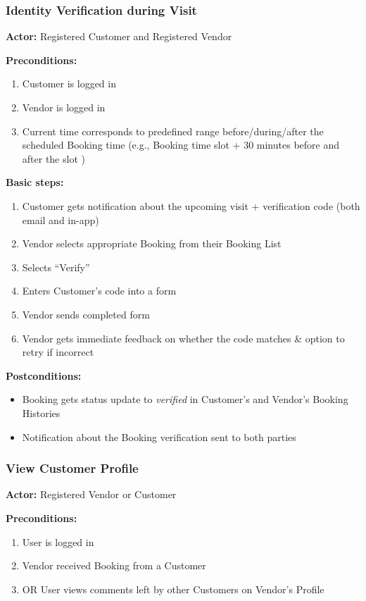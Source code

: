 \documentclass[11pt,a4paper]{article}
\begin{document}
\subsubsection{Identity Verification during Visit}

\textbf{Actor:} Registered Customer and Registered Vendor

\noindent \textbf{Preconditions:}
\begin{enumerate}
  \item Customer is logged in
  \item Vendor is logged in
  \item Current time corresponds to predefined range before/during/after the scheduled Booking time (e.g., Booking time slot + 30 minutes before and after the slot )
\end{enumerate}

\noindent \textbf{Basic steps:}
\begin{enumerate}
  \item Customer gets notification about the upcoming visit + verification code (both email and in-app)
  \item Vendor selects appropriate Booking from their Booking List
  \item Selects ``Verify''
  \item Enters Customer's code into a form
  \item Vendor sends completed form
  \item Vendor gets immediate feedback on whether the code matches \& option to retry if incorrect
\end{enumerate}

\noindent \textbf{Postconditions:}
\begin{itemize}
  \item Booking gets status update to \textit{verified} in Customer's and Vendor's Booking Histories
  \item Notification about the Booking verification sent to both parties
\end{itemize}

\subsubsection{View Customer Profile}

\textbf{Actor:} Registered Vendor or Customer

\noindent \textbf{Preconditions:}
\begin{enumerate}
  \item User is logged in
  \item Vendor received Booking from a Customer
  \item OR User views comments left by other Customers on Vendor's Profile
\end{enumerate}
\end{document}
